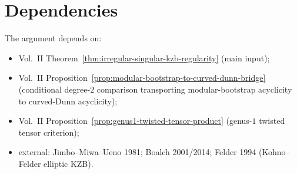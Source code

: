\documentclass[11pt]{amsart}
\theoremstyle{definition}
\theoremstyle{remark}
\begin{document}
\section{Dependencies}

The argument depends on:
\begin{itemize}[nosep]
\item Vol.~II Theorem~\ref*{thm:irregular-singular-kzb-regularity}
(main input);
\item Vol.~II Proposition~\ref*{prop:modular-bootstrap-to-curved-dunn-bridge}
(conditional degree-\(2\) comparison transporting
modular-bootstrap acyclicity to curved-Dunn acyclicity);
\item Vol.~II Proposition~\ref*{prop:genus1-twisted-tensor-product}
(genus-\(1\) twisted tensor criterion);
\item external: Jimbo--Miwa--Ueno 1981; Boalch 2001/2014;
Felder 1994 (Kohno--Felder elliptic KZB).
\end{itemize}
\end{document}
